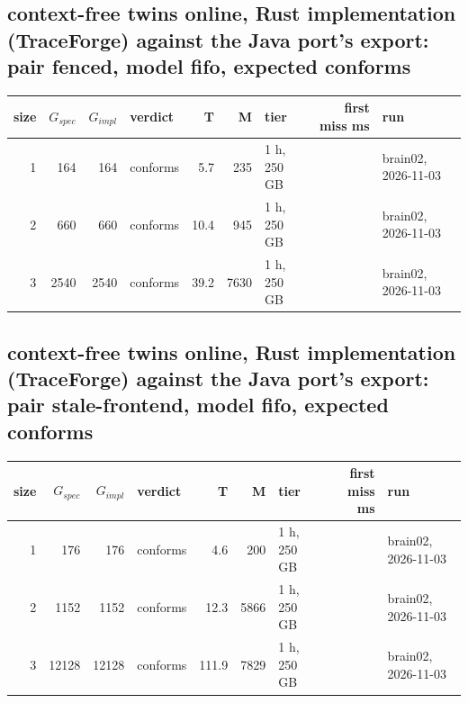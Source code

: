 \documentclass[10pt]{article}
\begin{document}
\subsection*{context-free twins online, Rust implementation (TraceForge) against the Java port's export: pair \textsf{fenced}, model fifo, expected conforms}
\begin{longtable}{@{}rrrlrrlrl@{}}
\toprule
size & $G_{\mathit{spec}}$ & $G_{\mathit{impl}}$ & verdict & T & M & tier & first miss ms & run \\
\midrule
\endhead
\color{red} 1 & 164 & 164 & conforms & 5.7 & 235 & 1 h, 250 GB &  & brain02, 2026-11-03 \\
\color{red} 2 & 660 & 660 & conforms & 10.4 & 945 & 1 h, 250 GB &  & brain02, 2026-11-03 \\
\color{red} 3 & 2540 & 2540 & conforms & 39.2 & 7630 & 1 h, 250 GB &  & brain02, 2026-11-03 \\
\bottomrule
\end{longtable}
\subsection*{context-free twins online, Rust implementation (TraceForge) against the Java port's export: pair \textsf{stale-frontend}, model fifo, expected conforms}
\begin{longtable}{@{}rrrlrrlrl@{}}
\toprule
size & $G_{\mathit{spec}}$ & $G_{\mathit{impl}}$ & verdict & T & M & tier & first miss ms & run \\
\midrule
\endhead
\color{red} 1 & 176 & 176 & conforms & 4.6 & 200 & 1 h, 250 GB &  & brain02, 2026-11-03 \\
\color{red} 2 & 1152 & 1152 & conforms & 12.3 & 5866 & 1 h, 250 GB &  & brain02, 2026-11-03 \\
\color{red} 3 & 12128 & 12128 & conforms & 111.9 & 7829 & 1 h, 250 GB &  & brain02, 2026-11-03 \\
\bottomrule
\end{longtable}
\end{document}
